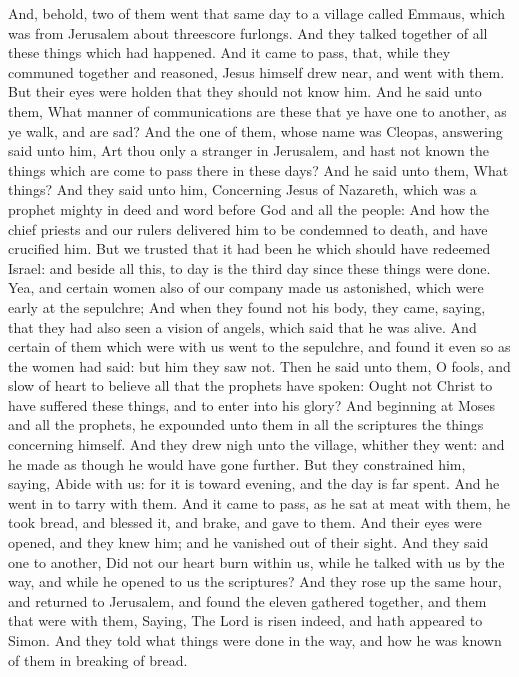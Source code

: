 And, behold, two of them went that same day to a village
called Emmaus, which was from Jerusalem about threescore furlongs.
 And they talked together of all these things which had
happened.  And it came to pass, that, while they communed
together and reasoned, Jesus himself drew near, and went with them.
 But their eyes were holden that they should not know him.
 And he said unto them, What manner of communications are
these that ye have one to another, as ye walk, and are sad?
 And the one of them, whose name was Cleopas, answering
said unto him, Art thou only a stranger in Jerusalem, and hast not known
the things which are come to pass there in these days?  And
he said unto them, What things? And they said unto him, Concerning Jesus
of Nazareth, which was a prophet mighty in deed and word before God and
all the people:  And how the chief priests and our rulers
delivered him to be condemned to death, and have crucified him.
 But we trusted that it had been he which should have
redeemed Israel: and beside all this, to day is the third day since
these things were done.  Yea, and certain women also of our
company made us astonished, which were early at the sepulchre;
 And when they found not his body, they came, saying, that
they had also seen a vision of angels, which said that he was alive.
 And certain of them which were with us went to the
sepulchre, and found it even so as the women had said: but him they saw
not.  Then he said unto them, O fools, and slow of heart to
believe all that the prophets have spoken:  Ought not
Christ to have suffered these things, and to enter into his glory?
 And beginning at Moses and all the prophets, he expounded
unto them in all the scriptures the things concerning himself.
 And they drew nigh unto the village, whither they went:
and he made as though he would have gone further.  But they
constrained him, saying, Abide with us: for it is toward evening, and
the day is far spent. And he went in to tarry with them. 
And it came to pass, as he sat at meat with them, he took bread, and
blessed it, and brake, and gave to them.  And their eyes
were opened, and they knew him; and he vanished out of their sight.
 And they said one to another, Did not our heart burn
within us, while he talked with us by the way, and while he opened to us
the scriptures?  And they rose up the same hour, and
returned to Jerusalem, and found the eleven gathered together, and them
that were with them,  Saying, The Lord is risen indeed, and
hath appeared to Simon.  And they told what things were
done in the way, and how he was known of them in breaking of bread.

